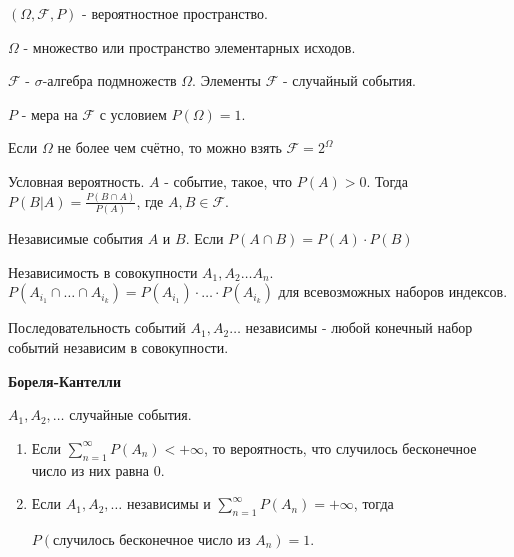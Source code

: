 
\begin{definition}
    $(\Omega, \mathcal{F}, P)$ - вероятностное пространство.

    $\Omega$ - множество или пространство элементарных исходов.

    $\mathcal{F}$ - $\sigma$-алгебра подмножеств $\Omega$. Элементы $\mathcal{F}$ - случайный события.

    $P$ - мера на $\mathcal{F}$ с условием $P(\Omega) = 1$.

    \begin{remark}
        Если $\Omega$ не более чем счётно, то можно взять $\mathcal{F} = 2^{\Omega}$
    \end{remark}
\end{definition}

\begin{definition}
    Условная вероятность. $A$ - событие, такое, что $P(A) > 0$.
    Тогда $P(B | A) = \frac{P(B \cap A)}{P(A)}$, где $A, B \in \mathcal{F}$.
\end{definition}

\begin{definition}
    Независимые события $A$ и $B$. Если $P(A \cap B) = P(A) \cdot P(B)$
\end{definition}

\begin{definition}
    Независимость в совокупности $A_1, A_2 \ldots A_n$. $P(A_{i_1} \cap \ldots \cap A_{i_k}) = P(A_{i_1}) \cdot \ldots \cdot P({A_{i_k}})$
    для всевозможных наборов индексов.
\end{definition}

\begin{definition}
    Последовательность событий $A_1, A_2 \ldots $ независимы - любой конечный набор событий
    независим в совокупности.
\end{definition}

\begin{lemma}
    \textbf{Бореля-Кантелли}

    $A_1, A_2, \ldots$ случайные события.

    \begin{enumerate}
        \item {
            Если $\sum_{n = 1}^{\infty} P(A_n) < +\infty$, то вероятность, что случилось бесконечное число из них равна 0.
        }
        \item {
            Если $A_1, A_2, \ldots$ независимы и $\sum_{n = 1}^{\infty} P(A_n) = +\infty$, тогда

            $P(\text{случилось бесконечное число из $A_n$}) = 1$.
        }
    \end{enumerate}
\end{lemma}


